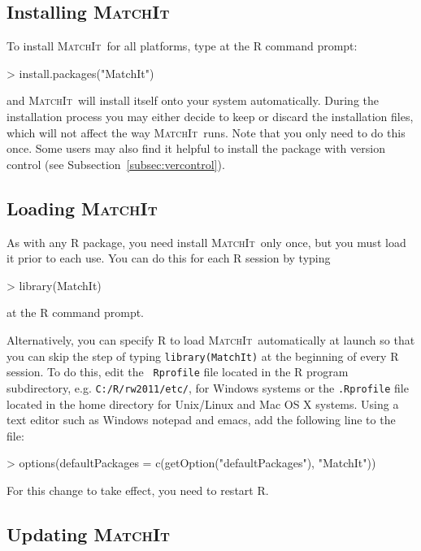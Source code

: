 \documentclass[oneside,letterpaper,titlepage]{article}
\newcommand{\MatchIt}{\textsc{MatchIt}}
\begin{document}
\subsection{Installing \MatchIt}
\label{subsec:install}

To install \MatchIt\ for all platforms, type at the R command prompt:
\begin{Schunk}
\begin{Sinput}
> install.packages("MatchIt")
\end{Sinput}
\end{Schunk}
and \MatchIt\ will install itself onto your system automatically.
During the installation process you may either decide to keep or
discard the installation files, which will not affect the way
\MatchIt\ runs.  Note that you only need to do this once.  Some users
may also find it helpful to install the package with version control
(see Subsection~\ref{subsec:vercontrol}).

\subsection{Loading \MatchIt} \label{subsec:load}

As with any R package, you need install \MatchIt\ only once, but you
must load it prior to each use.  You can do this for each R session by
typing
\begin{Schunk}
\begin{Sinput}
> library(MatchIt)
\end{Sinput}
\end{Schunk}
at the R command prompt.  

Alternatively, you can specify R to load \MatchIt\ automatically at
launch so that you can skip the step of typing {\tt library(MatchIt)}
at the beginning of every R session.  To do this, edit the {\tt
  Rprofile} file located in the R program subdirectory, e.g.
\texttt{C:/R/rw2011/etc/}, for Windows systems or the {\tt .Rprofile}
file located in the home directory for Unix/Linux and Mac OS X
systems.  Using a text editor such as Windows notepad and emacs, add
the following line to the file:
\begin{Schunk}
\begin{Sinput}
> options(defaultPackages = c(getOption("defaultPackages"), "MatchIt"))
\end{Sinput}
\end{Schunk}
For this change to take effect, you need to restart R.

\subsection{Updating \MatchIt}
\end{document}
